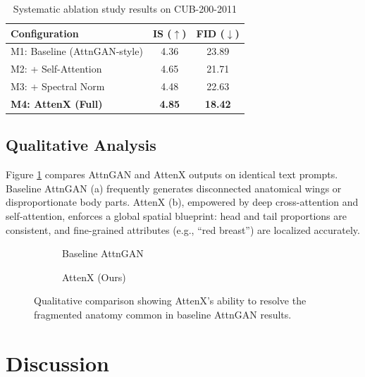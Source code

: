\documentclass[conference]{IEEEtran}
\begin{document}
\begin{table}[htbp]
\caption{Systematic ablation study results on CUB-200-2011}
\centering
\begin{tabular}{@{}lcc@{}}
\toprule
\textbf{Configuration} & \textbf{IS} ($\uparrow$) & \textbf{FID} ($\downarrow$) \\
\midrule
M1: Baseline (AttnGAN-style) & 4.36 & 23.89 \\
M2: + Self-Attention & 4.65 & 21.71 \\
M3: + Spectral Norm & 4.48 & 22.63 \\
\textbf{M4: AttenX (Full)} & \textbf{4.85} & \textbf{18.42} \\
\bottomrule
\end{tabular}
\label{tab:ablation}
\end{table}

\subsection{Qualitative Analysis}
Figure \ref{fig:comparison} compares AttnGAN and AttenX outputs on identical text prompts. Baseline AttnGAN (a) frequently generates disconnected anatomical wings or disproportionate body parts. AttenX (b), empowered by deep cross-attention and self-attention, enforces a global spatial blueprint: head and tail proportions are consistent, and fine-grained attributes (e.g., ``red breast'') are localized accurately.

\begin{figure}[htbp]
\centering
\begin{subfigure}{0.48\columnwidth}
\caption{Baseline AttnGAN}
\end{subfigure}
\begin{subfigure}{0.48\columnwidth}
\caption{AttenX (Ours)}
\end{subfigure}
\caption{Qualitative comparison showing AttenX's ability to resolve the fragmented anatomy common in baseline AttnGAN results.}
\label{fig:comparison}
\end{figure}

\section{Discussion}
\label{sec:discussion}
\end{document}
